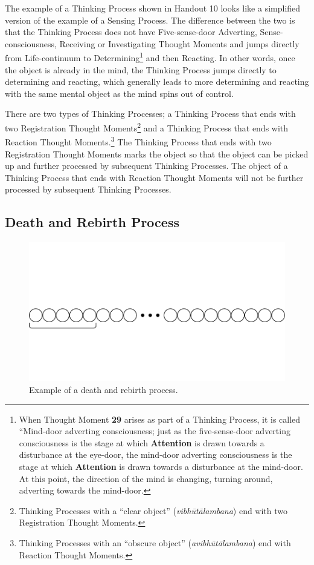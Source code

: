 The example of a Thinking Process shown in Handout 10 looks like a simplified version of the example of a Sensing Process. The difference between the two is that the Thinking Process does not have Five-sense-door Adverting, Sense-consciousness, Receiving or Investigating Thought Moments and jumps directly from Life-continuum to Determining\footnote{When Thought Moment \textbf{29} arises as part of a Thinking Process, it is called “Mind-door adverting consciousness; just as the five-sense-door adverting consciousness is the stage at which \textbf{Attention} is drawn towards a disturbance at the eye-door, the mind-door adverting consciousness is the stage at which \textbf{Attention} is drawn towards a disturbance at the mind-door. At this point, the direction of the mind is changing, turning around, adverting towards the mind-door.} and then Reacting. In other words, once the object is already in the mind, the Thinking Process jumps directly to determining and reacting, which generally leads to more determining and reacting with the same mental object as the mind spins out of control.

There are two types of Thinking Processes; a Thinking Process that ends with two Registration Thought Moments\footnote{Thinking Processes with a “clear object” (\textit{vibhūtālambana}) end with two Registration Thought Moments.} and a Thinking Process that ends with Reaction Thought Moments.\footnote{Thinking Processes with an “obscure object” (\textit{avibhūtālambana}) end with Reaction Thought Moments.} The Thinking Process that ends with two Registration Thought Moments marks the object so that the object can be picked up and further processed by subsequent Thinking Processes. The object of a Thinking Process that ends with Reaction Thought Moments will not be further processed by subsequent Thinking Processes.

\subsection*{Death and Rebirth Process}

\begin{figure}[h]
\centering
\includegraphics[width=1\linewidth]{./Diagrams/Death}
\caption{Example of a death and rebirth process.}
\label{fig:Death}
\end{figure}

